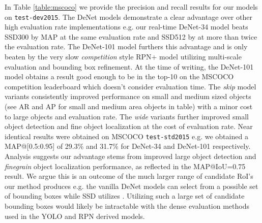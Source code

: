 \documentclass[10pt,twocolumn]{article}
\begin{document}
In Table \ref{table:mscoco} we provide the precision and recall results for our models on \texttt{test-dev2015}. The DeNet models demonstrate a clear advantage over other high evaluation rate implementations e.g. our real-time DeNet-34 model beats SSD300 by  MAP at the same evaluation rate and SSD512 by  at more than twice the evaluation rate. The DeNet-101 model furthers this advantage and is only beaten by the very slow \textit{competition} style RPN+ model utilizing multi-scale evaluation and bounding box refinement. At the time of writing, the DeNet-101 model obtains a result good enough to be in the top-10 on the MSCOCO competition leaderboard which doesn't consider evaluation time.
The \textit{skip} model variants consistently improved performance on small and medium sized objects (see AR and AP for small and medium area objects in table)
with a minor cost to large objects and evaluation rate. The \textit{wide} variants further improved small object detection and fine object localization at the cost of evaluation rate. Near identical results were obtained on MSCOCO \texttt{test-std2015} e.g. we obtained a MAP@[0.5:0.95] of 29.3\% and 31.7\% for DeNet-34 and DeNet-101 respectively. Analysis suggests our advantage stems from improved large object detection and \textit{finegrain} object localization performance, as reflected in the MAP@IoU=0.75 result. We argue this is an outcome of the much larger range of candidate RoI's our method produces e.g. the vanilla DeNet models can select from a possible set of  bounding boxes while SSD utilizes . Utilizing such a large set of candidate bounding boxes would likely be intractable with the dense evaluation methods used in the YOLO and RPN derived models. 
\end{document}
